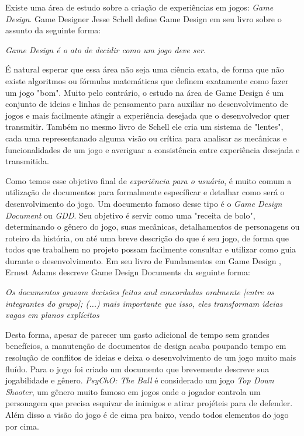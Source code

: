   Existe uma área de estudo sobre a criação de experiências em jogos: \textit{Game Design}. Game Designer Jesse Schell define Game Design em seu livro sobre o assunto \cite{jessegamedesign} da seguinte forma:

  \begin{displayquote}
    \textit{Game Design é o ato de decidir como um jogo deve ser.}
  \end{displayquote}

   É natural esperar que essa área não seja uma ciência exata, de forma que não existe algoritmos ou fórmulas matemáticas que definem exatamente como fazer um jogo "bom". Muito pelo contrário, o estudo na área de Game Design é um conjunto de ideias e linhas de pensamento para auxiliar no desenvolvimento de jogos e mais facilmente atingir a experiência desejada que o desenvolvedor quer transmitir. Também no mesmo livro de Schell \cite{jessegamedesign} ele cria um sistema de "lentes", cada uma representanado alguma visão ou crítica para analisar as mecânicas e funcionalidades de um jogo e averiguar a consistência entre experiência desejada e transmitida.

  Como temos esse objetivo final de \textit{experiência para o usuário}, é muito comum a utilização de documentos para formalmente específicar e detalhar como será o desenvolvimento do jogo. Um documento famoso desse tipo é o \textit{Game Design Document} ou \textit{GDD}. Seu objetivo é servir como uma "receita de bolo", determinando o gênero do jogo, suas mecânicas, detalhamentos de personagens ou roteiro da história, ou até uma breve descrição do que é seu jogo, de forma que todos que trabalhem no projeto possam facilmente consultar e utilizar como guia durante o desenvolvimento. Em seu livro de Fundamentos em Game Design \cite{ernestgamedesign}, Ernest Adams descreve Game Design Documents da seguinte forma:

  \begin{displayquote}
    \textit{Os documentos gravam decisões feitas and concordadas oralmente [entre os integrantes do grupo]; (...) mais importante que isso, eles transformam ideias vagas em planos explícitos}
  \end{displayquote}

  Desta forma, apesar de parecer um gasto adicional de tempo sem grandes benefícios, a manutenção de documentos de design acaba poupando tempo em resolução de conflitos de ideias e deixa o desenvolvimento de um jogo muito mais fluído. Para o jogo  foi criado um documento que brevemente descreve sua jogabilidade e gênero. \textit{PsyChO: The Ball} é considerado um jogo \textit{Top Down Shooter}, um gênero muito famoso em jogos onde o jogador controla um personagem que precisa esquivar de inimigos e atirar projéteis para de defender. Além disso a visão do jogo é de cima pra baixo, vendo todos elementos do jogo por cima.\\

